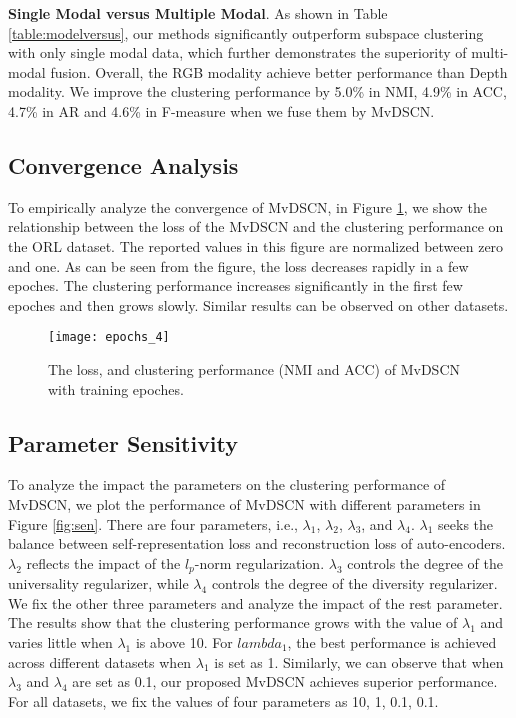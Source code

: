\documentclass[journal]{IEEEtran}
\begin{document}
\textbf{Single Modal versus Multiple Modal}.
As shown in Table \ref{table:modelversus}, our methods significantly outperform subspace clustering with only single modal data, which further demonstrates the superiority of multi-modal fusion.
Overall, the RGB modality achieve better performance than Depth modality.
We improve the clustering performance by 5.0\% in NMI, 4.9\% in ACC, 4.7\% in AR and 4.6\% in F-measure when we fuse them by MvDSCN.

\subsection{Convergence Analysis}
To empirically analyze the convergence of MvDSCN, in Figure \ref{fig:converage}, we show the relationship between the loss of the MvDSCN and the clustering performance on the ORL dataset.
The reported values in this figure are normalized between zero and one.
As can be seen from the figure, the loss decreases rapidly in a few epoches.
The clustering performance increases significantly in the first few epoches and then grows slowly.
Similar results can be observed on other datasets.
\begin{figure}[!htbp]
	\centering
	\texttt{[image: epochs\_4]}
	\caption{The loss, and clustering performance (NMI and ACC) of MvDSCN with training epoches.}
	\label{fig:converage}
\end{figure}

\subsection{Parameter Sensitivity}
To analyze the impact the parameters on the clustering performance of MvDSCN, we plot the performance of MvDSCN with different parameters in Figure \ref{fig:sen}.
There are four parameters, i.e., $\lambda_1$, $\lambda_2$, $\lambda_3$, and $\lambda_4$.
$\lambda_1$ seeks the balance between self-representation loss and reconstruction loss of auto-encoders.
$\lambda_2$ reflects the impact of the $l_p$-norm regularization.
$\lambda_3$ controls the degree of the universality regularizer, while $\lambda_4$ controls the degree of the diversity regularizer.
We fix the other three parameters and analyze the impact of the rest parameter.
The results show that the clustering performance grows with the value of $\lambda_1$ and varies little when $\lambda_1$ is above 10.
For $lambda_1$, the best performance is achieved across different datasets when $\lambda_1$ is set as 1.
Similarly, we can observe that when $\lambda_3$ and $\lambda_4$ are set as 0.1, our proposed MvDSCN achieves superior performance.
For all datasets, we fix the values of four parameters as 10, 1, 0.1, 0.1.
\end{document}
